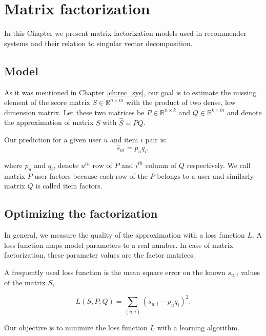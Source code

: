 \chapter{Matrix factorization}\label{ch:mf}
In this Chapter we present matrix factorization models used in recommender systems 
and their relation to singular vector decomposition. 

\section{Model} 

As it was mentioned in Chapter \ref{ch:rec_sys}, our goal is to estimate the missing element of the 
score matrix $S\in\mathbb{R}^{n\times m}$ with the product of two dense, low dimension 
matrix. Let these two matrices be $P\in\mathbb{R}^{n\times k}$ and 
$Q\in\mathbb{R}^{k\times m}$ and denote the approximation of matrix $S$ with 
$\hat{S}=PQ$.

Our prediction for a given user $u$ and item $i$ pair is:
\[\hat{s}_{ui}=p_{u}q_{i},\]

where $p_u$ and $q_i$, denote $u^{th}$ row  of $P$ and  $i^{th}$ column of $Q$
respectively. We call matrix $P$ user factors because each row  of the $P$ belongs 
to a user and similarly matrix $Q$ is called item factors. 

\section{Optimizing the factorization}
In general, we measure the quality of the approximation with a loss function $L$. 
A loss function maps model parameters to a real number. In case of matrix factorization, these 
parameter values are the factor matrices.

A frequently used loss function is the mean square error on the known $s_{u,i}$ values 
of the matrix $S$,

\[L(S,P;Q)=\sum_{(u,i)}(s_{u,i}-p_{u}q_{i})^2 .\]

Our objective is to minimize the loss function $L$ with a learning algorithm.

